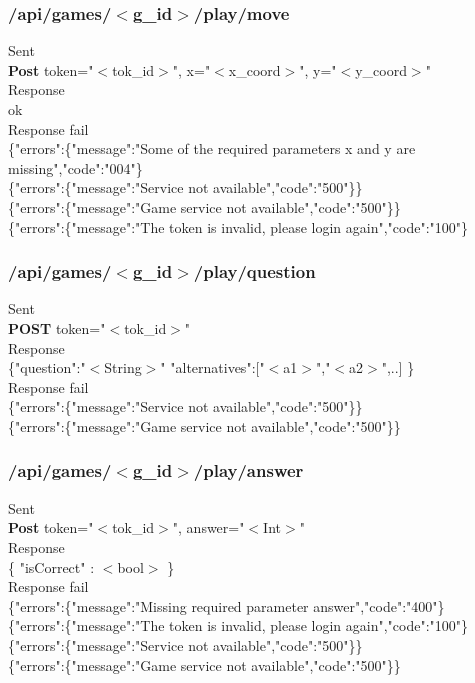 \subsubsection{/api/games/$<$g\_id$>$/play/move}
\tab	Sent\\
\tab\tab	\textbf{Post} token="$<$tok\_id$>$", x="$<$x\_coord$>$", y="$<$y\_coord$>$"\\
\tab	Response \\
\tab{} ok\\
\tab	Response fail\\
\tab\tab	\{"errors":\{"message":"Some of the required parameters x and y are missing","code":"004"\}\\
\tab\tab	\{"errors":\{"message":"Service not available","code":"500"\}\}\\
\tab\tab	\{"errors":\{"message":"Game service not available","code":"500"\}\}\\
\tab\tab	\{"errors":\{"message":"The token is invalid, please login again","code":"100"\}\\

\subsubsection{/api/games/$<$g\_id$>$/play/question}
\tab	Sent\\
\tab\tab	\textbf{POST} token="$<$tok\_id$>$"\\
\tab	Response\\
\tab\tab	\{"question":"$<$String$>$" "alternatives":$[$"$<$a1$>$","$<$a2$>$",..$]$ \}\\
\tab	Response fail\\
\tab\tab	\{"errors":\{"message":"Service not available","code":"500"\}\}\\
\tab\tab	\{"errors":\{"message":"Game service not available","code":"500"\}\}\\

\subsubsection{/api/games/$<$g\_id$>$/play/answer}
\tab	Sent\\
\tab\tab	\textbf{Post} token="$<$tok\_id$>$", answer="$<$Int$>$" \\
\tab	Response\\
\tab\tab	\{ "isCorrect" : $<$bool$>$ \}\\
\tab	Response fail\\
\tab\tab	\{"errors":\{"message":"Missing required parameter answer","code":"400"\}\\
\tab\tab	\{"errors":\{"message":"The token is invalid, please login again","code":"100"\}\\
\tab\tab	\{"errors":\{"message":"Service not available","code":"500"\}\}\\
\tab\tab	\{"errors":\{"message":"Game service not available","code":"500"\}\}\\


